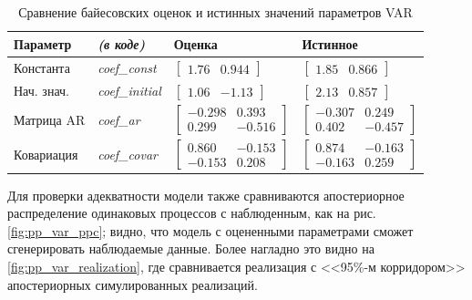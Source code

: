 \documentclass[a4paper,14pt]{extreport}
\begin{document}
\begin{table}[H]
	\begin{tabular}{ll|ll}
		\textbf{Параметр} & \textit{\textbf{(в коде)}} & \textbf{Оценка}              & \textbf{Истинное}            \\ \hline
		Константа         & \textit{coef\_const}       & $\begin{bmatrix} 1.76 & 0.944 \end{bmatrix}$ & $\begin{bmatrix} 1.85 & 0.866 \end{bmatrix}$ \\
		Нач. знач.        & \textit{coef\_initial}     & $\begin{bmatrix} 1.06 & -1.13 \end{bmatrix}$ & $\begin{bmatrix} 2.13 & 0.857 \end{bmatrix}$ \\
		Матрица AR        & \textit{coef\_ar}          & $\begin{bmatrix} -0.298 & 0.393 \\ 0.299 & -0.516 \end{bmatrix}$ & $\begin{bmatrix} -0.307 & 0.249 \\ 0.402 & -0.457 \end{bmatrix}$ \\
		Ковариация        & \textit{coef\_covar}       & $\begin{bmatrix} 0.860 & -0.153 \\ -0.153 & 0.208 \end{bmatrix}$ & $\begin{bmatrix} 0.874 & -0.163 \\ -0.163 & 0.259 \end{bmatrix}$ \\ \hline
	\end{tabular}
	\caption{Сравнение байесовских оценок и истинных значений параметров VAR}
	\label{tbl:pp_var_param_comparison}
\end{table}


Для проверки адекватности модели также сравниваются апостериорное распределение одинаковых процессов с наблюденным, как на рис. \ref{fig:pp_var_ppc}; видно, что модель с оцененными параметрами сможет сгенерировать наблюдаемые данные. Более нагладно это видно на \ref{fig:pp_var_realization}, где сравнивается реализация с <<95\%-м корридором>> апостериорных симулированных реализаций. 
\end{document}
